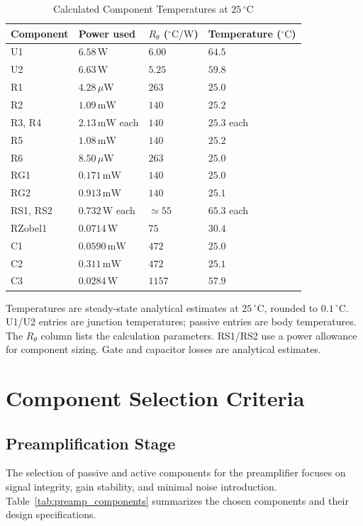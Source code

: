\documentclass[conference,letterpaper]{IEEEtran}
\newcommand{\W}{\mathrm{W}}
\begin{document}
\begin{table}[H]
\caption{Calculated Component Temperatures at $25\,{}^\circ\mathrm{C}$}
\label{tab:thermal}
\centering\footnotesize
\setlength{\tabcolsep}{2pt}
\begin{tabular}{@{}p{}p{}p{}p{}@{}}
\toprule
Component & Power used & $R_\theta$ (${}^\circ\mathrm{C/W}$) & Temperature (${}^\circ\mathrm{C}$)\\
\midrule
U1 & $6.58\,\W$ & $6.00$ & $64.5$\\
U2 & $6.63\,\W$ & $5.25$ & $59.8$\\
R1 & $4.28\,\mu\W$ & $263$ & $25.0$\\
R2 & $1.09\,\mathrm{mW}$ & $140$ & $25.2$\\
R3, R4 & $2.13\,\mathrm{mW}$ each & $140$ & $25.3$ each\\
R5 & $1.08\,\mathrm{mW}$ & $140$ & $25.2$\\
R6 & $8.50\,\mu\W$ & $263$ & $25.0$\\
RG1 & $0.171\,\mathrm{mW}$ & $140$ & $25.0$\\
RG2 & $0.913\,\mathrm{mW}$ & $140$ & $25.1$\\
RS1, RS2 & $0.732\,\W$ each & $\simeq55$ & $65.3$ each\\
RZobel1 & $0.0714\,\W$ & $75$ & $30.4$\\
C1 & $0.0590\,\mathrm{mW}$ & $472$ & $25.0$\\
C2 & $0.311\,\mathrm{mW}$ & $472$ & $25.1$\\
C3 & $0.0284\,\W$ & $1157$ & $57.9$\\
\bottomrule
\end{tabular}
\par\smallskip
\parbox{.97\columnwidth}{\scriptsize
Temperatures are steady-state analytical estimates at
$25\,{}^\circ\mathrm{C}$, rounded to $0.1\,{}^\circ\mathrm{C}$.
U1/U2 entries are junction temperatures; passive entries are body
temperatures. The $R_\theta$ column lists the calculation parameters.
RS1/RS2 use a power allowance for component sizing. Gate and capacitor
losses are analytical estimates.}
\end{table}
\FloatBarrier

\section{Component Selection Criteria}
\subsection{Preamplification Stage}
The selection of passive and active components for the preamplifier focuses on signal integrity, gain stability, and minimal noise introduction. Table~\ref{tab:preamp_components} summarizes the chosen components and their design specifications.
\end{document}
